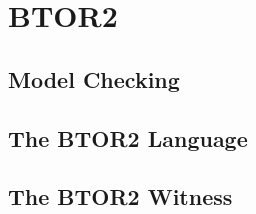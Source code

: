 \chapter{BTOR2}\label{chap:btor2}

\section{Model Checking}

\section{The BTOR2 Language}

\section{The BTOR2 Witness}\label{witness}